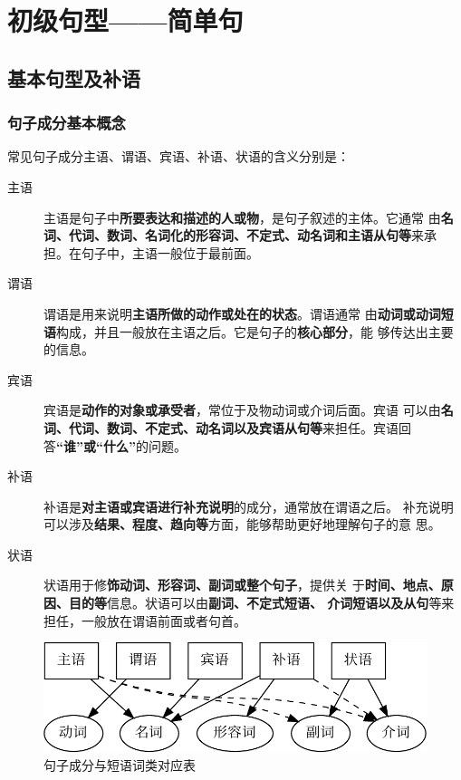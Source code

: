 \part{初级句型——简单句}

\chapter{基本句型及补语}

\section{句子成分基本概念}

常见句子成分主语、谓语、宾语、补语、状语的含义分别是：
\begin{description}
\item[主语] 主语是句子中\textbf{所要表达和描述的人或物}，是句子叙述的主体。它通常
  由\textbf{名词、代词、数词、名词化的形容词、不定式、动名词和主语从句等}来承
  担。在句子中，主语一般位于最前面。

\item[谓语] 谓语是用来说明\textbf{主语所做的动作或处在的状态}。谓语通常
  由\textbf{动词或动词短语}构成，并且一般放在主语之后。它是句子的\textbf{核心部分}，能
  够传达出主要的信息。

\item[宾语] 宾语是\textbf{动作的对象或承受者}，常位于及物动词或介词后面。宾语
  可以由\textbf{名词、代词、数词、不定式、动名词以及宾语从句等}来担任。宾语回
  答\textbf{“谁”或“什么”}的问题。

\item[补语] 补语是\textbf{对主语或宾语进行补充说明}的成分，通常放在谓语之后。
  补充说明可以涉及\textbf{结果、程度、趋向等}方面，能够帮助更好地理解句子的意
  思。
\item[状语] 状语用于修\textbf{饰动词、形容词、副词或整个句子}，提供关
  于\textbf{时间、地点、原因、目的等}信息。状语可以由\textbf{副词、不定式短语、
    介词短语以及从句}等来担任，一般放在谓语前面或者句首。
\end{description}

\begin{figure}[ht]
  \centering
  \includegraphics[width=0.7\linewidth]{svo.pdf}
  \caption{\label{fig:svo}句子成分与短语词类对应表}
\end{figure}


